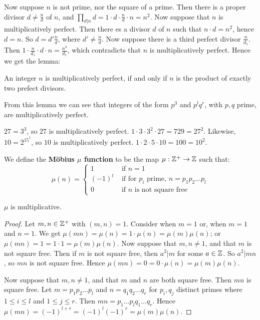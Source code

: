 Now suppose $n$ is not prime, nor the square of a prime. Then there is a proper divisor $d \neq \frac{n}{d}$ of $n$, and $\prod_{d|n} d=1 \cdot d \cdot \frac{n}{d} \cdot n=n^2$. Now suppose that $n$ is multiplicatively perfect. Then there es a divisor $d$ of $n$ such that $n \cdot d=n^2$, hence $d=n$. So $d=d'\frac{n}{d}$, where $d' \neq \frac{n}{d}$. Now suppose there is a third perfect divisor $\frac{n}{d_1}$. Then $1 \cdot \frac{n}{d_1} \cdot d \cdot n=\frac{n^3}{d_1}$, which contradicts that $n$ is multiplicatively perfect. Hence we get the lemma:

\begin{lemma}\label{lemma2.2.9}
    An integer $n$ is multiplicatively perfect, if and only if $n$ is the product of exactly two prefect divisors.
\end{lemma}

From this lemma we can see that integers of the form $p^3$ and $p^lq^r$, with $p,q$ prime, are multiplicatively perfect.

\begin{example}
    $27=3^3$, so $27$ is multiplicatively perfect. $1 \cdot 3 \cdot 3^2 \cdot 27=729=27^2$. Likewise, $10=2^15^1$, so $10$ is multiplicatively perfect. $1 \cdot 2 \cdot 5 \cdot 10=100=10^2$.
\end{example}

\begin{definition}
    We define the \textbf{M\"obius $\mu$ function} to be the map $\mu:\mathbb{Z}^+\rightarrow \mathbb{Z}$ such that:
        \begin{equation}
            \mu(n)=\begin{cases}
                    1 & \text{ if } n=1 \\
                    (-1)^l & \text{ if for $p_i$ prime, } n=p_1p_2 \dots p_l \\
                    0 & \text{ if  $n$ is not square free}
            \end{cases}
        \end{equation}
\end{definition}

\begin{lemma}\label{lemma2.2.10}
    $\mu$ is multiplicative.
\end{lemma}
\begin{proof}
    Let $m,n \in \mathbb{Z}^+$ with $(m,n)=1$. Consider when $m=1$ or, when $m=1$ and $n=1$. We get $\mu(mn)=\mu(n)=1 \cdot \mu(n)=\mu(m)\mu(n)$; or $\mu(mn)=1=1 \cdot 1=\mu(m)\mu(n)$. Now suppose that $m,n \neq 1$, and that $m$ is not square free. Then if $m$ is not square free, then $a^2|m$ for some $a \in \mathbb{Z}$. So $a^2|mn$, so $mn$ is not square free. Hence $\mu(mn)=0=0 \cdot \mu(n)=\mu(m)\mu(n)$.
    
    Now suppose that $m,n \neq 1$, and that $m$ and $n$ are both square free. Then $mn$ is square free. Let $m=p_1p_2 \dots p_l$ and $n=q_1q_2 \dots q_r$ for $p_i,q_j$ distinct primes where $1 \leq i \leq l$ and $1 \leq j \leq r$. Then $mn=p_1 \dots p_lq_1 \dots q_r$. Hence $\mu(mn)=(-1)^{l+r}=(-1)^l(-1)^r=\mu(m)\mu(n)$. 
\end{proof}

